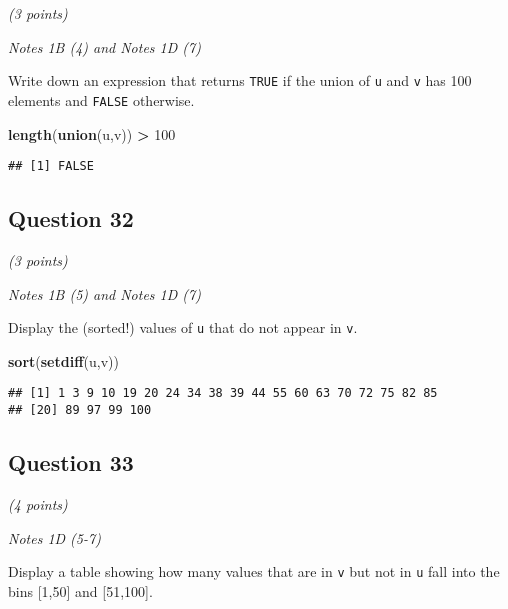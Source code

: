 \documentclass[
]{article}
\newenvironment{Shaded}{\begin{snugshade}}{\end{snugshade}}
\newcommand{\DecValTok}[1]{\textcolor[rgb]{0.00,0.00,0.81}{#1}}
\newcommand{\KeywordTok}[1]{\textcolor[rgb]{0.13,0.29,0.53}{\textbf{#1}}}
\newcommand{\NormalTok}[1]{#1}
\newcommand{\OperatorTok}[1]{\textcolor[rgb]{0.81,0.36,0.00}{\textbf{#1}}}
\newcommand{\StringTok}[1]{\textcolor[rgb]{0.31,0.60,0.02}{#1}}
\begin{document}
\emph{(3 points)}

\emph{Notes 1B (4) and Notes 1D (7)}

Write down an expression that returns \texttt{TRUE} if the union of
\texttt{u} and \texttt{v} has 100 elements and \texttt{FALSE} otherwise.

\begin{Shaded}
\begin{Highlighting}[]
\KeywordTok{length}\NormalTok{(}\KeywordTok{union}\NormalTok{(u,v)) }\OperatorTok{>}\StringTok{ }\DecValTok{100}
\end{Highlighting}
\end{Shaded}

\begin{verbatim}
## [1] FALSE
\end{verbatim}

\hypertarget{question-32}{%
\subsection{Question 32}\label{question-32}}

\emph{(3 points)}

\emph{Notes 1B (5) and Notes 1D (7)}

Display the (sorted!) values of \texttt{u} that do not appear in
\texttt{v}.

\begin{Shaded}
\begin{Highlighting}[]
\KeywordTok{sort}\NormalTok{(}\KeywordTok{setdiff}\NormalTok{(u,v))}
\end{Highlighting}
\end{Shaded}

\begin{verbatim}
## [1] 1 3 9 10 19 20 24 34 38 39 44 55 60 63 70 72 75 82 85
## [20] 89 97 99 100
\end{verbatim}

\hypertarget{question-33}{%
\subsection{Question 33}\label{question-33}}

\emph{(4 points)}

\emph{Notes 1D (5-7)}

Display a table showing how many values that are in \texttt{v} but not
in \texttt{u} fall into the bins {[}1,50{]} and {[}51,100{]}.
\end{document}
